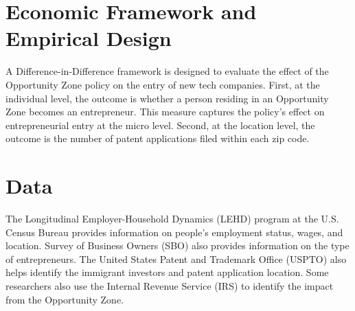 \section{Economic Framework and Empirical Design}
A Difference-in-Difference framework is designed to evaluate the effect of the Opportunity Zone policy on the entry of new tech companies. First, at the individual level, the outcome is whether a person residing in an Opportunity Zone becomes an entrepreneur. This measure captures the policy’s effect on entrepreneurial entry at the micro level. Second, at the location level, the outcome is the number of patent applications filed within each zip code. 

\section{Data}
The Longitudinal Employer-Household Dynamics (LEHD) program at the U.S. Census Bureau provides information on people's employment status, wages, and location.  Survey of Business Owners (SBO) also provides information on the type of entrepreneurs. The United States Patent and Trademark Office (USPTO) also helps identify the immigrant investors and patent application location. Some researchers also use the Internal Revenue Service (IRS) to identify the impact from the Opportunity Zone.

 




